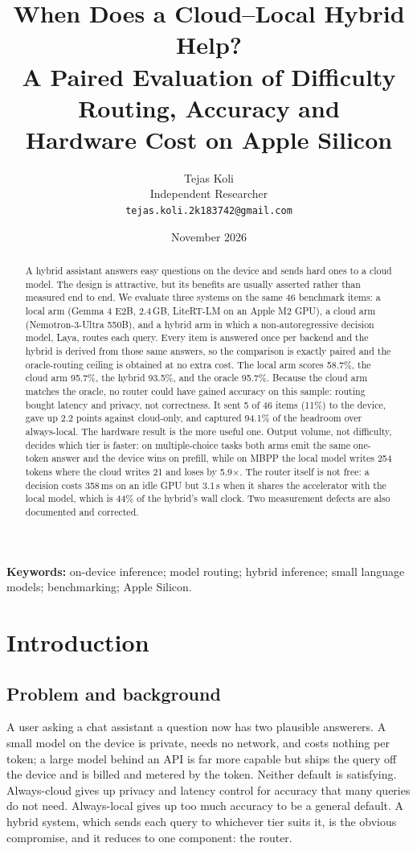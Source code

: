 \documentclass[11pt,a4paper]{article}
\title{\vspace{-1.2cm}\textbf{When Does a Cloud--Local Hybrid Help?\\[3pt]
\large A Paired Evaluation of Difficulty Routing, Accuracy and\\[1pt]
Hardware Cost on Apple Silicon}}
\author{Tejas Koli\\[2pt]
\small Independent Researcher\\[1pt]
\small \texttt{tejas.koli.2k183742@gmail.com}}
\date{November 2026}
\begin{document}
\maketitle

\begin{abstract}
\noindent
A hybrid assistant answers easy questions on the device and sends hard ones to
a cloud model. The design is attractive, but its benefits are usually asserted
rather than measured end to end. We evaluate three systems on the same
46 benchmark items: a local arm (Gemma 4 E2B, 2.4\,GB, LiteRT-LM on an
Apple M2 GPU), a cloud arm (Nemotron-3-Ultra 550B), and a hybrid arm in which a
non-autoregressive decision model, Laya, routes each query. Every item is
answered once per backend and the hybrid is derived from those same answers, so
the comparison is exactly paired and the oracle-routing ceiling is obtained at
no extra cost. The local arm scores 58.7\%, the cloud arm
95.7\%, the hybrid 93.5\%, and the oracle
95.7\%. Because the cloud arm matches the oracle, no router could
have gained accuracy on this sample: routing bought latency and privacy, not
correctness. It sent 5 of 46 items
(11\%) to the device, gave up 2.2 points
against cloud-only, and captured 94.1\% of the headroom over
always-local. The hardware result is the more useful one. Output volume, not
difficulty, decides which tier is faster: on multiple-choice tasks both arms
emit the same one-token answer and the device wins on prefill, while on
MBPP the local model writes 254 tokens where the cloud writes
21 and loses by 5.9$\times$. The router itself is not free: a
decision costs 358\,ms on an idle GPU but 3.1\,s
when it shares the accelerator with the local model, which is
44\% of the hybrid's wall clock. Two measurement defects are also
documented and corrected.
\end{abstract}

\vspace{-0.2cm}
\noindent\textbf{Keywords:} on-device inference; model routing; hybrid
inference; small language models; benchmarking; Apple Silicon.

\section{Introduction}

\subsection{Problem and background}
A user asking a chat assistant a question now has two plausible answerers. A
small model on the device is private, needs no network, and costs nothing per
token; a large model behind an API is far more capable but ships the query off
the device and is billed and metered by the token. Neither default is
satisfying. Always-cloud gives up privacy and latency control for accuracy that
many queries do not need. Always-local gives up too much accuracy to be a
general default. A hybrid system, which sends each query to whichever tier
suits it, is the obvious compromise, and it reduces to one component: the
router.
\end{document}
